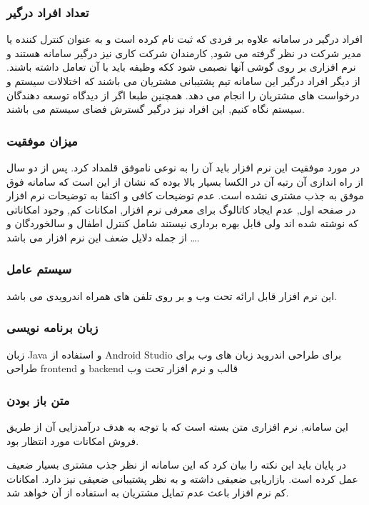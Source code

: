 \subsubsection{تعداد افراد درگیر}
افراد درگیر در سامانه علاوه بر فردی که ثبت نام کرده است و به عنوان کنترل کننده یا مدیر شرکت در نظر گرفته می شود, کارمندان شرکت کاری نیز درگیر سامانه هستند و نرم افزاری بر روی گوشی آنها نصبمی شود ککه وظیفه باید با آن تعامل داشته باشند. از دیگر افراد درگیر این سامانه تیم پشتیبانی مشتریان می باشند که اختلالات سیستم و درخواست های مشتریان را انجام می دهد. همچنین طبعا اگر از دیدگاه توسعه دهندگان سیستم نگاه کنیم, این افراد نیز درگیر گسترش فضای سیستم می باشند.

\subsubsection{میزان موفقیت}
در مورد موفقیت این نرم افزار باید آن را به نوعی ناموفق قلمداد کرد. پس از دو سال از راه اندازی آن رتبه آن در الکسا بسیار بالا بوده که نشان از این است که سامانه فوق موفق به جذب مشتری نشده است. عدم توضیحات کافی و اکتفا به توضیحات نرم افزار در صفحه اول, عدم ایجاد کاتالوگ برای معرفی نرم افزار, امکانات کم, وجود امکاناتی که نوشته شده اند ولی قابل بهره برداری نیستند شامل کنترل اطفال و سالخوردگان و … از جمله دلایل ضعف این نرم افزار می باشد.

\subsubsection{سیستم عامل}
این نرم افزار قابل ارائه تحت وب و بر روی تلفن های همراه اندرویدی می باشد.

\subsubsection{زبان برنامه نویسی}
زبان Java و استفاده از Android Studio برای طراحی اندروید
زبان های وب برای طراحی  frontend و backend  قالب و نرم افزار تحت وب 

\subsubsection{متن باز بودن}
این سامانه, نرم افزاری متن بسته است که با توجه به هدف درآمدزایی آن از طریق فروش امکانات مورد انتظار بود.

در پایان باید این نکته را بیان کرد که این سامانه از نظر جذب مشتری بسیار ضعیف عمل کرده است. بازاریابی ضعیفی داشته و به نظر پشتیبانی ضعیفی نیز دارد. امکانات کم نرم افزار باعث عدم تمایل مشتریان به استفاده از آن خواهد شد.


